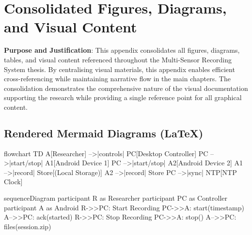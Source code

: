 \chapter{Consolidated Figures, Diagrams, and Visual Content}

\textbf{Purpose and Justification}: This appendix consolidates all figures, diagrams, tables, and visual content referenced throughout the Multi-Sensor Recording System thesis. By centralising visual materials, this appendix enables efficient cross-referencing while maintaining narrative flow in the main chapters. The consolidation demonstrates the comprehensive nature of the visual documentation supporting the research while providing a single reference point for all graphical content.




\section*{Rendered Mermaid Diagrams (LaTeX)}

\begin{mermaid}
	flowchart TD
	A[Researcher] -->|controls| PC[Desktop Controller]
	PC -->|start/stop| A1[Android Device 1]
	PC -->|start/stop| A2[Android Device 2]
	A1 -->|record| Store[(Local Storage)]
	A2 -->|record| Store
	PC -->|sync| NTP[NTP Clock]
\end{mermaid}

\begin{mermaid}
	sequenceDiagram
	participant R as Researcher
	participant PC as Controller
	participant A as Android
	R->>PC: Start Recording
	PC->>A: start(timestamp)
	A-->>PC: ack(started)
	R->>PC: Stop Recording
	PC->>A: stop()
	A-->>PC: files(session.zip)
\end{mermaid}

